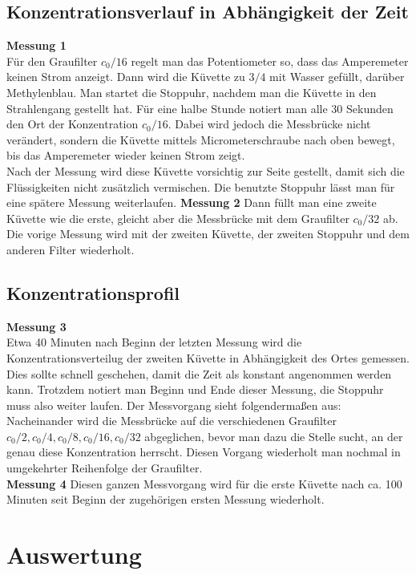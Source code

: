 \documentclass[12pt,a4paper,titlepage,headinclude,bibtotoc]{scrartcl}
\begin{document}
\subsection{Konzentrationsverlauf in Abhängigkeit der Zeit}
\textbf{Messung 1}\\
Für den Graufilter $c_0/16$ regelt man das Potentiometer so, dass das Amperemeter keinen Strom anzeigt.
Dann wird die Küvette zu $3/4$ mit Wasser gefüllt, darüber Methylenblau.
Man startet die Stoppuhr, nachdem man die Küvette in den Strahlengang gestellt hat.
Für eine halbe Stunde notiert man alle 30 Sekunden den Ort der Konzentration $c_0/16$.
Dabei wird jedoch die Messbrücke nicht verändert, sondern die Küvette mittels Micrometerschraube nach oben bewegt, bis das Amperemeter wieder keinen Strom zeigt.\\
Nach der Messung wird diese Küvette vorsichtig zur Seite gestellt, damit sich die Flüssigkeiten nicht zusätzlich vermischen.
Die benutzte Stoppuhr lässt man für eine spätere Messung weiterlaufen.
\textbf{Messung 2}
Dann füllt man eine zweite Küvette wie die erste, gleicht aber die Messbrücke mit dem Graufilter $c_0/32$ ab.
Die vorige Messung wird mit der zweiten Küvette, der zweiten Stoppuhr und dem anderen Filter wiederholt.
\subsection{Konzentrationsprofil}
\textbf{Messung 3}\\
Etwa 40 Minuten nach Beginn der letzten Messung wird die Konzentrationsverteilug der zweiten Küvette in Abhängigkeit des Ortes gemessen.
Dies sollte schnell geschehen, damit die Zeit als konstant angenommen werden kann.
Trotzdem notiert man Beginn und Ende dieser Messung, die Stoppuhr muss also weiter laufen.
Der Messvorgang sieht folgendermaßen aus:
Nacheinander wird die Messbrücke auf die verschiedenen Graufilter $c_0/2, c_0/4, c_0/8, c_0/16, c_0/32$ abgeglichen, bevor man dazu die Stelle sucht, an der genau diese Konzentration herrscht.
Diesen Vorgang wiederholt man nochmal in umgekehrter Reihenfolge der Graufilter.\\
\textbf{Messung 4}
Diesen ganzen Messvorgang wird für die erste Küvette nach ca. 100 Minuten  seit Beginn der zugehörigen ersten Messung wiederholt. 

\section{Auswertung}
\label{sec:auswertung}
\end{document}
